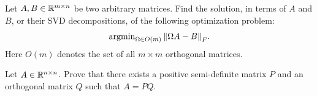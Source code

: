 \begin{myexercise}\label{prob:rotation_min}
    Let $A, B \in \mathbb{R}^{m\times n}$ be two arbitrary matrices. Find the solution, in terms of $A$ and $B$, or their SVD decompositions, of the following optimization problem:
    \begin{equation*}
        \operatorname{argmin}_{\Omega \in O(m)} {\left\lVert{\Omega A-B}\right\rVert}_{F}.
    \end{equation*}
    Here $O(m)$ denotes the set of all $m\times m$ orthogonal matrices.
\end{myexercise}

\begin{myexercise}\label{prob:polar_decomposition}
    Let $A \in \mathbb{R}^{n\times n}$. Prove that there exists a positive semi-definite matrix $P$ and an orthogonal matrix $Q$ such that $A = PQ$.
\end{myexercise}

